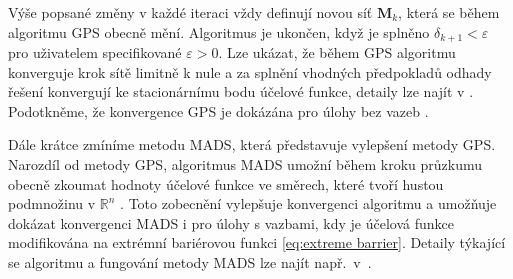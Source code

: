 Výše popsané změny v každé iteraci vždy definují novou síť $ \mathbf{M} _k$, která se během algoritmu GPS obecně mění. Algoritmus je ukončen, když je splněno $ \delta_{k+1} < \varepsilon $ pro uživatelem specifikované $ \varepsilon > 0 $. Lze ukázat, že během GPS algoritmu konverguje krok sítě limitně k nule a za splnění vhodných předpokladů odhady řešení konvergují ke stacionárnímu bodu účelové funkce, detaily lze najít v \cite{BBO-textbook}. Podotkněme, že konvergence GPS je dokázána pro úlohy bez vazeb \cite{BBO-textbook}.

Dále krátce zmíníme metodu MADS, která představuje vylepšení metody GPS. Narozdíl od metody GPS, algoritmus MADS umožní během kroku průzkumu obecně zkoumat hodnoty účelové funkce ve směrech, které tvoří hustou podmnožinu v $ \mathbb{R}^{n} $ \cite{BBO-textbook, derivative-free-review}. Toto zobecnění vylepšuje konvergenci algoritmu a umožňuje dokázat konvergenci MADS i pro úlohy s vazbami, kdy je účelová funkce modifikována na extrémní bariérovou funkci \ref{eq:extreme barrier}. Detaily týkající se algoritmu a fungování metody MADS lze najít např.~v~\cite{BBO-textbook}.